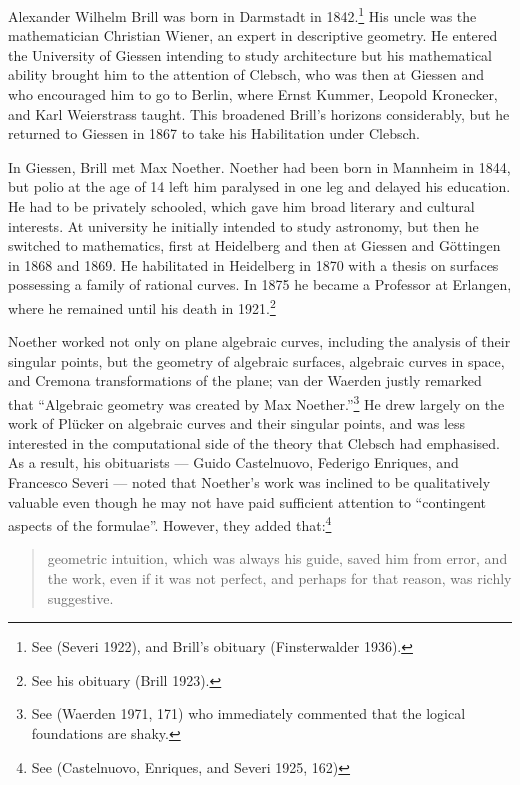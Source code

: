 Alexander Wilhelm Brill was born in Darmstadt in 1842.\footnote{See (Severi 1922),  and Brill's obituary (Finsterwalder 1936).} His  uncle was the mathematician Christian Wiener, an expert in descriptive geometry. He entered the University of Giessen intending to study architecture but his mathematical ability brought him to the attention of Clebsch, who was then at Giessen and who encouraged him to go  to Berlin, where  Ernst Kummer,  Leopold Kronecker, and Karl Weierstrass taught. This broadened Brill's horizons considerably, but he returned to Giessen in 1867 to take his Habilitation  under Clebsch.

In Giessen, Brill met Max Noether. Noether had been born in Mannheim in 1844, but polio at the age of 14 left him paralysed in one leg and delayed his education. He had to be privately schooled, which gave him  broad literary and cultural interests. At university he  initially intended to study astronomy, but then he switched to mathematics, first at Heidelberg and then at Giessen and G\"ottingen in 1868 and 1869. He habilitated in Heidelberg in 1870 with a thesis on surfaces possessing a family of rational curves. In 1875 he became a Professor at Erlangen, where he remained until his death in 1921.\footnote{See his obituary (Brill 1923).} 


Noether  worked not only on plane algebraic curves, including the analysis of their singular points, but the geometry of algebraic surfaces,  algebraic curves in space, and Cremona transformations of the plane;  van der Waerden justly remarked that ``Algebraic geometry was created by Max Noether.''\footnote{See (Waerden 1971, 171) who immediately commented that the logical foundations are shaky.} 
He drew largely on the work of Pl\"ucker on algebraic curves and their singular points, and was less interested in the computational side of the theory that Clebsch had emphasised. As a result, his obituarists --- Guido Castelnuovo, Federigo Enriques, and Francesco Severi --- noted that Noether's work was inclined to be qualitatively valuable even though he may not have paid sufficient attention to ``contingent aspects of the formulae''.  However, they added that:\footnote{See (Castelnuovo, Enriques, and Severi 1925, 162)}
\begin{quote}
geometric intuition, which was always his guide, saved him from error, and the work, even if it was not perfect, and perhaps for that reason, was richly suggestive.
\end{quote}



